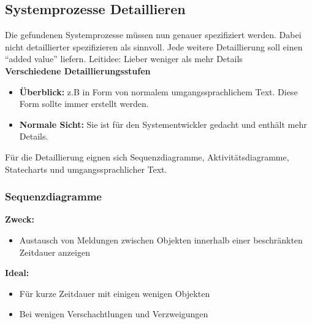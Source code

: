 \subsection{Systemprozesse Detaillieren}
Die gefundenen Systemprozesse müssen nun genauer spezifiziert werden. Dabei nicht detaillierter spezifizieren als sinnvoll. Jede weitere Detaillierung soll einen "`added value"' liefern. 
Leitidee: Lieber weniger als mehr Details\\

\textbf{Verschiedene Detaillierungsstufen}
\begin{itemize}
	\item \textbf{Überblick: } z.B in Form von normalem umgangssprachlichem Text. Diese Form sollte immer erstellt werden.
	\item \textbf{Normale Sicht: } Sie ist für den Systementwickler gedacht und enthält mehr Details.  
\end{itemize}

Für die Detaillierung eignen sich Sequenzdiagramme, Aktivitätsdiagramme, Statecharts und umgangssprachlicher Text.

\subsubsection{Sequenzdiagramme}

\begin{multicols}{2}
	\textbf{Zweck:}
	\begin{itemize}
		\item Austausch von Meldungen zwischen Objekten innerhalb einer beschränkten Zeitdauer anzeigen
	\end{itemize}
	\columnbreak
	
	\textbf{Ideal:}
	\begin{itemize}
		\item Für kurze Zeitdauer mit einigen wenigen Objekten
		\item Bei wenigen Verschachtlungen und Verzweigungen
	\end{itemize}
\end{multicols}


